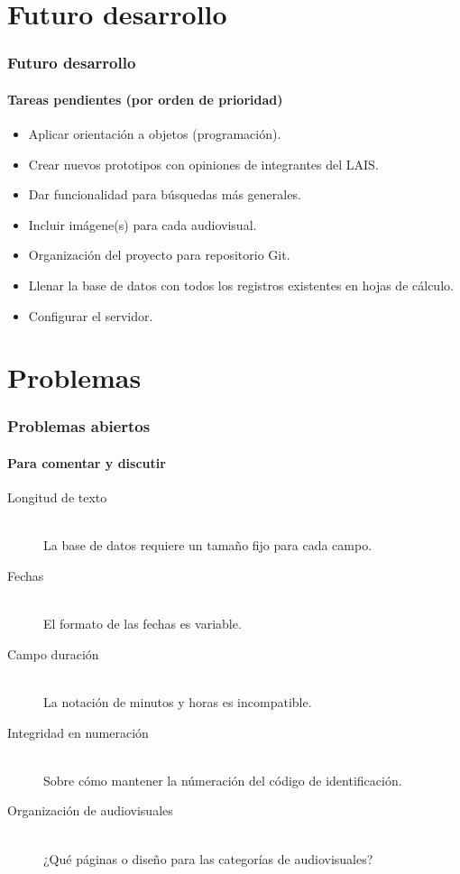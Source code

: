 \documentclass{beamer}
\begin{document}
\section{Futuro desarrollo}
\begin{frame}
	\frametitle{Futuro desarrollo}
	\framesubtitle{Tareas pendientes (por orden de prioridad)}
	\begin{itemize}
		\item Aplicar orientación a objetos (programación).
		\item Crear nuevos prototipos con opiniones de integrantes del LAIS.
		\item Dar funcionalidad para búsquedas más generales.
		\item Incluir imágene(s) para cada audiovisual.
		\item Organización del proyecto para repositorio Git.
		\item Llenar la base de datos con todos los registros existentes en hojas de cálculo.
		\item Configurar el servidor.
	\end{itemize}
\end{frame}

\section{Problemas}
\begin{frame}
	\frametitle{Problemas abiertos}
	\framesubtitle{Para comentar y discutir}
	\begin{description}
		\item[Longitud de texto] \hfill \\
			La base de datos requiere un tamaño fijo para cada campo.
		\item[Fechas] \hfill \\
			El formato de las fechas es variable.
		\item[Campo duración] \hfill \\
			La notación de minutos y horas es incompatible.
		\item[Integridad en numeración] \hfill \\
			Sobre cómo mantener la númeración del código de identificación.
		\item[Organización de audiovisuales] \hfill \\
			¿Qué páginas o diseño para las categorías de audiovisuales?
	\end{description}
\end{frame}
\end{document}
